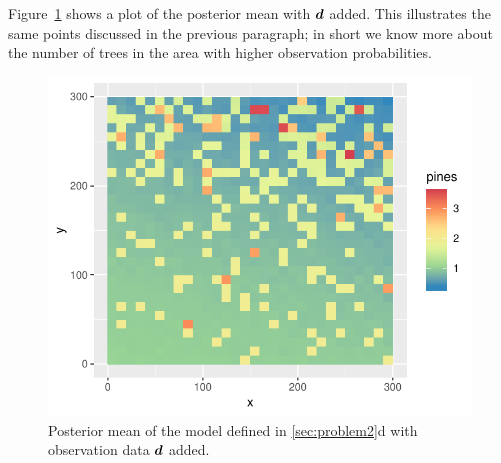 Figure~\ref{fig:p2_posterior_mean} shows a plot of the posterior mean with $\bm{d}$ added. This illustrates the same points discussed in the previous paragraph; in short we know more about the number of trees in the area with higher observation probabilities.

\begin{figure}
    \centering
    \includegraphics{figures/p2_posterior_mean.pdf}
    \caption{Posterior mean of the model defined in \ref{sec:problem2}d with observation data $\bm{d}$ added.}
    \label{fig:p2_posterior_mean}
\end{figure}
